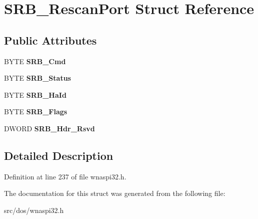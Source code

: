\hypertarget{structSRB__RescanPort}{\section{S\-R\-B\-\_\-\-Rescan\-Port Struct Reference}
\label{structSRB__RescanPort}
}
\subsection*{Public Attributes}
\begin{DoxyCompactItemize}
\item 
\hypertarget{structSRB__RescanPort_aac7878a99264d6cadff3a7f4c15affbd}{B\-Y\-T\-E {\bfseries S\-R\-B\-\_\-\-Cmd}}\label{structSRB__RescanPort_aac7878a99264d6cadff3a7f4c15affbd}

\item 
\hypertarget{structSRB__RescanPort_aa64943f55b77d43470b5cf1ab2f38285}{B\-Y\-T\-E {\bfseries S\-R\-B\-\_\-\-Status}}\label{structSRB__RescanPort_aa64943f55b77d43470b5cf1ab2f38285}

\item 
\hypertarget{structSRB__RescanPort_aef324611bef1c4344e245a31230d9451}{B\-Y\-T\-E {\bfseries S\-R\-B\-\_\-\-Ha\-Id}}\label{structSRB__RescanPort_aef324611bef1c4344e245a31230d9451}

\item 
\hypertarget{structSRB__RescanPort_a1dde32894d2c6867243ebf289d85f9d4}{B\-Y\-T\-E {\bfseries S\-R\-B\-\_\-\-Flags}}\label{structSRB__RescanPort_a1dde32894d2c6867243ebf289d85f9d4}

\item 
\hypertarget{structSRB__RescanPort_a5c10eef59ef9e00d78a2ee036bd94556}{D\-W\-O\-R\-D {\bfseries S\-R\-B\-\_\-\-Hdr\-\_\-\-Rsvd}}\label{structSRB__RescanPort_a5c10eef59ef9e00d78a2ee036bd94556}

\end{DoxyCompactItemize}


\subsection{Detailed Description}


Definition at line 237 of file wnaspi32.\-h.



The documentation for this struct was generated from the following file\-:\begin{DoxyCompactItemize}
\item 
src/dos/wnaspi32.\-h\end{DoxyCompactItemize}
